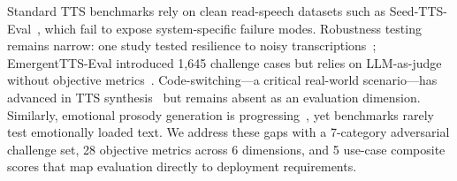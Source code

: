 Standard TTS benchmarks rely on clean read-speech datasets such as
Seed-TTS-Eval~\cite{anastassiou2024seedtts}, which fail to expose
system-specific failure modes. Robustness testing remains narrow: one study
tested resilience to noisy transcriptions~\cite{feng2024robustness};
EmergentTTS-Eval introduced 1,645 challenge cases but relies on
LLM-as-judge without objective metrics~\cite{manku2025emergentttseval}.
Code-switching---a critical real-world scenario---has advanced in TTS
synthesis~\cite{zhou2020codeswitching,wu2024mole} but remains absent as an
evaluation dimension. Similarly, emotional prosody generation is
progressing~\cite{lei2022msemotts}, yet benchmarks rarely test emotionally
loaded text. We address these gaps with a 7-category adversarial challenge
set, 28 objective metrics across 6 dimensions, and 5 use-case composite
scores that map evaluation directly to deployment requirements.

